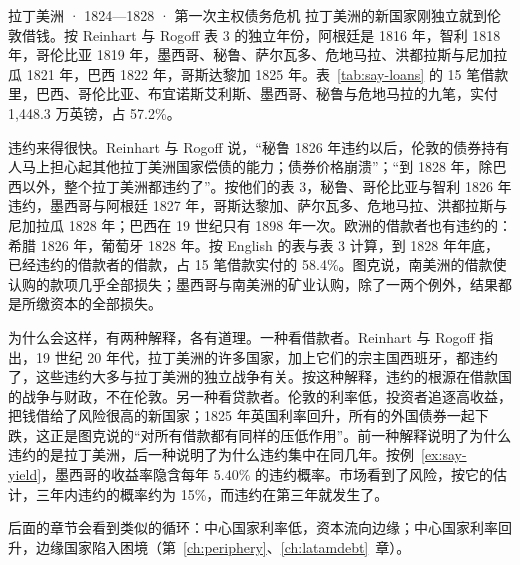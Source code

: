 \begin{case}{拉丁美洲 · 1824—1828 · 第一次主权债务危机}
拉丁美洲的新国家刚独立就到伦敦借钱。按 Reinhart 与 Rogoff 表 3 的独立年份，阿根廷是 1816 年，智利 1818 年，哥伦比亚 1819 年，墨西哥、秘鲁、萨尔瓦多、危地马拉、洪都拉斯与尼加拉瓜 1821 年，巴西 1822 年，哥斯达黎加 1825 年\cite{reinhart2008tid}。表~\ref{tab:say-loans} 的 15 笔借款里，巴西、哥伦比亚、布宜诺斯艾利斯、墨西哥、秘鲁与危地马拉的九笔，实付 1,448.3 万英镑，占 57.2\%\cite{english1827}。

违约来得很快。Reinhart 与 Rogoff 说，“秘鲁 1826 年违约以后，伦敦的债券持有人马上担心起其他拉丁美洲国家偿债的能力；债券价格崩溃”；“到 1828 年，除巴西以外，整个拉丁美洲都违约了”\cite{reinhart2008tid}。按他们的表 3，秘鲁、哥伦比亚与智利 1826 年违约，墨西哥与阿根廷 1827 年，哥斯达黎加、萨尔瓦多、危地马拉、洪都拉斯与尼加拉瓜 1828 年；巴西在 19 世纪只有 1898 年一次\cite{reinhart2008tid}。欧洲的借款者也有违约的：希腊 1826 年，葡萄牙 1828 年\cite{reinhart2008tid}。按 English 的表与表 3 计算，到 1828 年年底，已经违约的借款者的借款，占 15 笔借款实付的 58.4\%。图克说，南美洲的借款使认购的款项几乎全部损失；墨西哥与南美洲的矿业认购，除了一两个例外，结果都是所缴资本的全部损失\cite{tooke1838v2}。

为什么会这样，有两种解释，各有道理。一种看借款者。Reinhart 与 Rogoff 指出，19 世纪 20 年代，拉丁美洲的许多国家，加上它们的宗主国西班牙，都违约了，这些违约大多与拉丁美洲的独立战争有关\cite{reinhart2008tid}。按这种解释，违约的根源在借款国的战争与财政，不在伦敦。另一种看贷款者。伦敦的利率低，投资者追逐高收益，把钱借给了风险很高的新国家；1825 年英国利率回升，所有的外国债券一起下跌，这正是图克说的“对所有借款都有同样的压低作用”。前一种解释说明了为什么违约的是拉丁美洲，后一种说明了为什么违约集中在同几年。按例~\ref{ex:say-yield}，墨西哥的收益率隐含每年 5.40\% 的违约概率。市场看到了风险，按它的估计，三年内违约的概率约为 15\%，而违约在第三年就发生了。

后面的章节会看到类似的循环：中心国家利率低，资本流向边缘；中心国家利率回升，边缘国家陷入困境（第~\ref{ch:periphery}、\ref{ch:latamdebt}~章）。
\end{case}


